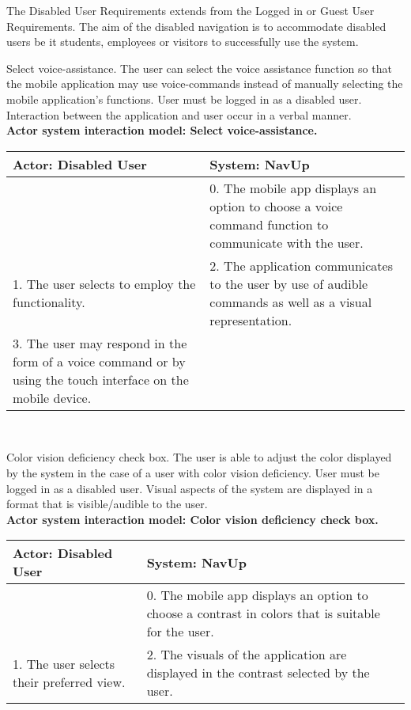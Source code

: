 The Disabled User Requirements extends from the Logged in or Guest User Requirements. The aim of the disabled navigation is to accommodate disabled users be it students, employees or visitors to successfully use the system.

\FuncReq
{Select voice-assistance.}
{The user can select the voice assistance function so that the mobile application may use voice-commands instead of manually selecting the mobile application's functions.}
{User must be logged in as a disabled user.}
{Interaction between the application and user occur in a verbal manner.}
    \\
    \textbf{Actor system interaction model: Select voice-assistance.}\\
    \begin{tabular}{ | p{6cm} | p{6cm} |}
    \hline
    Actor: Disabled User & System: NavUp \\ \hline
     & 0. The mobile app displays an option to choose a voice command function to communicate with the user.\\ \hline
    1. The user selects to employ the functionality. & 2. The application communicates to the user by use of audible commands as well as a visual representation.\\ \hline
    3. The user may respond in the form of a voice command or by using the touch interface on the mobile device. & \\ \hline
    
    \end{tabular}
\\
\bigskip

\FuncReq
{Color vision deficiency check box.}
{The user is able to adjust the color displayed by the system in the case of a user with color vision deficiency.}
{User must be logged in as a disabled user.}
{Visual aspects of the system are displayed in a format that is visible/audible to the user.}
    \\
    \textbf{Actor system interaction model: Color vision deficiency check box.}\\
    \begin{tabular}{ | p{6cm} | p{6cm} |}
    \hline
    Actor: Disabled User & System: NavUp \\ \hline
     & 0. The mobile app displays an option to choose a contrast in colors that is suitable for the user.\\ \hline
    1. The user selects their preferred view. & 2. The visuals of the application are displayed in the contrast selected by the user.\\ \hline   
    \end{tabular}
\\
\bigskip

